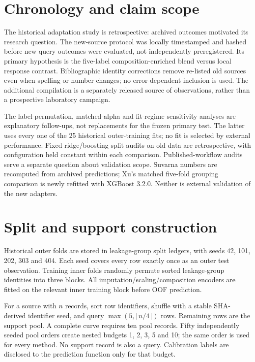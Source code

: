 \documentclass[11pt]{article}
\begin{document}
\section{Chronology and claim scope}
The historical adaptation study is retrospective: archived outcomes motivated its research question. The new-source protocol was locally timestamped and hashed before new query outcomes were evaluated, not independently preregistered. Its primary hypothesis is the five-label composition-enriched blend versus local response contrast. Bibliographic identity corrections remove re-listed old sources even when spelling or number changes; no error-dependent inclusion is used. The additional compilation is a separately released source of observations, rather than a prospective laboratory campaign.

The label-permutation, matched-alpha and fit-regime sensitivity analyses are explanatory follow-ups, not replacements for the frozen primary test. The latter uses every one of the 25 historical outer-training fits; no fit is selected by external performance. Fixed ridge/boosting split audits on old data are retrospective, with configuration held constant within each comparison. Published-workflow audits serve a separate question about validation scope. Suvarna numbers are recomputed from archived predictions; Xu's matched five-fold grouping comparison is newly refitted with XGBoost 3.2.0. Neither is external validation of the new adapters.

\section{Split and support construction}
Historical outer folds are stored in leakage-group split ledgers, with seeds 42, 101, 202, 303 and 404. Each seed covers every row exactly once as an outer test observation. Training inner folds randomly permute sorted leakage-group identities into three blocks. All imputation/scaling/composition encoders are fitted on the relevant inner training block before OOF prediction.

For a source with $n$ records, sort row identifiers, shuffle with a stable SHA-derived identifier seed, and query $\max(5,\lceil n/4\rceil)$ rows. Remaining rows are the support pool. A complete curve requires ten pool records. Fifty independently seeded pool orders create nested budgets 1, 2, 3, 5 and 10; the same order is used for every method. No support record is also a query. Calibration labels are disclosed to the prediction function only for that budget.
\end{document}
